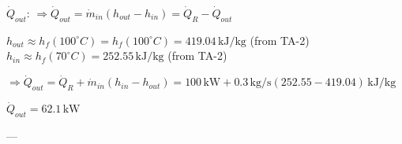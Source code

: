\( \dot{Q}_{out} \):  
\(\Rightarrow \dot{Q}_{out} = \dot{m}_{in} (h_{out} - h_{in}) = \dot{Q}_R - \dot{Q}_{out}\)  

\( h_{out} \approx h_f(100^\circ C) = h_f(100^\circ C) = 419.04 \, \text{kJ/kg} \) (from TA-2)  
\( h_{in} \approx h_f(70^\circ C) = 252.55 \, \text{kJ/kg} \) (from TA-2)  

\(\Rightarrow \dot{Q}_{out} = \dot{Q}_R + \dot{m}_{in} (h_{in} - h_{out}) = 100 \, \text{kW} + 0.3 \, \text{kg/s} (252.55 - 419.04) \, \text{kJ/kg}\)  

\(\dot{Q}_{out} = 62.1 \, \text{kW}\)  

---